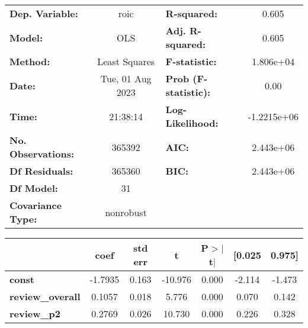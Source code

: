 \begin{center}
\begin{tabular}{lclc}
\toprule
\textbf{Dep. Variable:}                                               &       roic       & \textbf{  R-squared:         } &      0.605   \\
\textbf{Model:}                                                       &       OLS        & \textbf{  Adj. R-squared:    } &      0.605   \\
\textbf{Method:}                                                      &  Least Squares   & \textbf{  F-statistic:       } &  1.806e+04   \\
\textbf{Date:}                                                        & Tue, 01 Aug 2023 & \textbf{  Prob (F-statistic):} &      0.00    \\
\textbf{Time:}                                                        &     21:38:14     & \textbf{  Log-Likelihood:    } & -1.2215e+06  \\
\textbf{No. Observations:}                                            &      365392      & \textbf{  AIC:               } &  2.443e+06   \\
\textbf{Df Residuals:}                                                &      365360      & \textbf{  BIC:               } &  2.443e+06   \\
\textbf{Df Model:}                                                    &          31      & \textbf{                     } &              \\
\textbf{Covariance Type:}                                             &    nonrobust     & \textbf{                     } &              \\
\bottomrule
\end{tabular}
\begin{tabular}{lcccccc}
                                                                      & \textbf{coef} & \textbf{std err} & \textbf{t} & \textbf{P$> |$t$|$} & \textbf{[0.025} & \textbf{0.975]}  \\
\midrule
\textbf{const}                                                        &      -1.7935  &        0.163     &   -10.976  &         0.000        &       -2.114    &       -1.473     \\
\textbf{review\_overall}                                              &       0.1057  &        0.018     &     5.776  &         0.000        &        0.070    &        0.142     \\
\textbf{review\_p2}                                                   &       0.2769  &        0.026     &    10.730  &         0.000        &        0.226    &        0.328     \\

\end{tabular}
\end{center}
